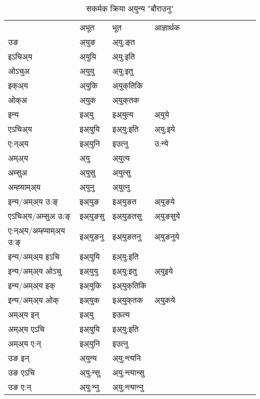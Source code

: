 \begin{table}[H]
\label{u.vt} \centering
\caption{सकर्मक क्रिया  अ्युन्य  "बौराउनु"  }
\begin{tabular}{l|l|l|l|l|l|l|l|l|l|l|l|l}  \toprule
&अभूत & भूत & आज्ञार्थक \\ 
उङ &अ्युङ &अ्यु:ङ्‌त \\ 
इऽचिअ्य &अ्युयि &अ्यु:इति   \\ 
ओऽचुअ &अ्युयु &अ्यु:इतु   \\ 
इक्अ्य &अ्युकि &अ्युक्‌तिकि   \\ 
ओक्अ &अ्युक &अ्युक्‌तक   \\ 
इन्य & इअ्यु & इअ्युत्य &अ्युये  \\ 
एऽचिअ्य & इअ्युयि & इअ्यु:इति &अ्यु:इये    \\ 
ए:न्अ्य & इअ्युनि  & इउत्‍नु &उ:न्ये  \\ 
अम्अ्य & अ्यु & अ्युत्य   \\ 
अम्सुअ & अ्युसु & अ्युत्सु     \\ 
अम्ह्‍याम्अ्य & अ्युनु  & अ्युत्‍नु \\ 
\midrule
इन्य/अम्अ्य उ:ङ्‌&इअ्युङ &इअ्युङत &अ्युङये \\ 
एऽचिअ्य/अम्सुअ उ:ङ्‌ &इअ्युङसु &इअ्युङतसु &अ्युङसुये \\ 
ए:न्अ्य/अम्ह्‍याम्अ्य उ:ङ्‌ &इअ्युङनु &इअ्युङतनु &अ्युङनुये \\ 
इन्य/अम्अ्य इऽचि &इअ्युयि &इअ्यु:इति    \\ 
इन्य/अम्अ्य ओऽचु &इअ्युयु &इअ्यु:इतु  &अ्युइये  \\ 
इन्य/अम्अ्य इक् &इअ्युकि &इअ्युक्‌तिकि   \\ 
इन्य/अम्अ्य ओक् &इअ्युक &इअ्युक्‌तक  &अ्युकये  \\ 
अम्अ्य इन् & इअ्यु & इऊत्य   \\ 
अम्अ्य एऽचि & इअ्युयि & इअ्यु:इति     \\ 
अम्अ्य ए:न् & इअ्युनि  & इउत्‍नु  \\ 
\midrule
उङ इन् & अ्युन्य  & अ्यु:न्त्यनि  \\ 
उङ एऽचि & अ्यु:न्सु  & अ्यु:न्त्यान्सु   \\ 
उङ ए:न्& अ्यु:न्‍नु  & अ्यु:न्त्यान्‍नु   \\ 
\bottomrule
\end{tabular}
\end{table}


